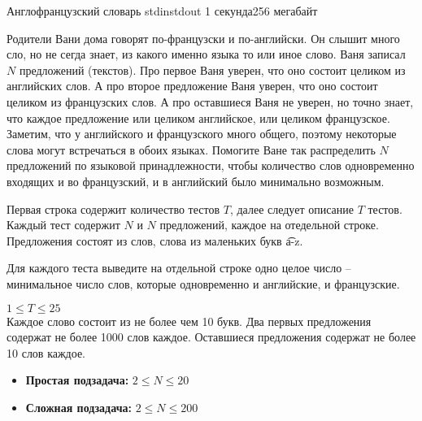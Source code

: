 
\begin{problem}{Англофранцузский словарь}
{stdin}{stdout}
{1 секунда}{256 мегабайт}{}

Родители Вани дома говорят по-французски и по-английски. Он слышит много сло, но не сегда знает, из какого именно языка то или иное слово.
Ваня записал $N$ предложений (текстов).
Про первое Ваня уверен, что оно состоит целиком из английских слов.
А про второе предложение Ваня уверен, что оно состоит целиком из французских слов.
А про оставшиеся Ваня не уверен, но точно знает, что каждое предложение или целиком английское, или целиком французское.
Заметим, что у английского и французского много общего, поэтому некоторые слова могут встречаться в обоих языках.
Помогите Ване так распределить $N$ предложений по языковой принадлежности, чтобы количество слов одновременно
входящих и во французский, и в английский было минимально возможным.

\InputFile

Первая строка содержит количество тестов $T$, далее следует описание $T$ тестов.
Каждый тест содержит $N$ и $N$ предложений, каждое на отедельной строке.
Предложения состоят из слов, слова из маленьких букв \t{a-z}.

\OutputFile

Для каждого теста выведите на отдельной строке одно целое число -- минимальное число слов, которые одновременно и английские, и французские.

\Scoring

$1 \le T \le 25$\\
Каждое слово состоит из не более чем 10 букв.
Два первых предложения содержат не более 1000 слов каждое.
Оставшиеся предложения содержат не более 10 слов каждое.

\begin{itemize}
  \item {\bf Простая подзадача:} $2 \le N \le 20$ 
  \item {\bf Сложная подзадача:} $2 \le N \le 200$ 
\end{itemize}

\Examples

\begin{example}
%
\end{example}

\end{problem}

